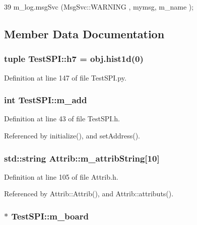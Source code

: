 \begin{DoxyCode}
39 { m_log.msgSvc (MsgSvc::WARNING , mymsg, m_name ); }
\end{DoxyCode}


\subsection{Member Data Documentation}
\hypertarget{classTestSPI_addecac183610bf8070caf3338e94a5c8}{
\subsubsection[{h7}]{\setlength{\rightskip}{0pt plus 5cm}tuple {\bf TestSPI::h7} = obj.hist1d(0)}}
\label{classTestSPI_addecac183610bf8070caf3338e94a5c8}


Definition at line 147 of file TestSPI.py.\hypertarget{classTestSPI_aa30affe50de58083b1dcca878903b0a7}{
\subsubsection[{m\_\-add}]{\setlength{\rightskip}{0pt plus 5cm}int {\bf TestSPI::m\_\-add}}}
\label{classTestSPI_aa30affe50de58083b1dcca878903b0a7}


Definition at line 43 of file TestSPI.h.

Referenced by initialize(), and setAddress().\hypertarget{classAttrib_a3414521d7a82476e874b25a5407b5e63}{
\subsubsection[{m\_\-attribString}]{\setlength{\rightskip}{0pt plus 5cm}std::string {\bf Attrib::m\_\-attribString}\mbox{[}10\mbox{]}}}
\label{classAttrib_a3414521d7a82476e874b25a5407b5e63}


Definition at line 105 of file Attrib.h.

Referenced by Attrib::Attrib(), and Attrib::attributs().\hypertarget{classTestSPI_a2852d24b4449df4c3722c25c7d9e08d4}{
\subsubsection[{m\_\-board}]{$\ast$ {\bf TestSPI::m\_\-board}}}
\label{classTestSPI_a2852d24b4449df4c3722c25c7d9e08d4}



